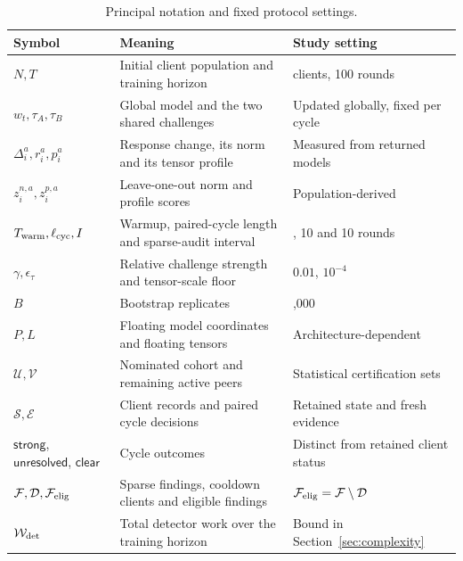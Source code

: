\begin{table}[t]\centering\footnotesize
\renewcommand{\arraystretch}{1.05}
\caption{Principal notation and fixed protocol settings.}\label{tab:notation-settings}
\begin{tabular}{>{\raggedright\arraybackslash}p{3.1cm}>{\raggedright\arraybackslash}p{8.0cm}>{\raggedright\arraybackslash}p{4.8cm}}\toprule
Symbol & Meaning & Study setting \\ \midrule
$N,T$ & Initial client population and training horizon & 100 clients, 100 rounds \\
$w_t,\tau_A,\tau_B$ & Global model and the two shared challenges & Updated globally, fixed per cycle \\
$\Delta_i^a,r_i^a,p_i^a$ & Response change, its norm and its tensor profile & Measured from returned models \\
$z_i^{n,a},z_i^{p,a}$ & Leave-one-out norm and profile scores & Population-derived \\
$T_{\rm warm},\ell_{\rm cyc},I$ & Warmup, paired-cycle length and sparse-audit interval & 10, 10 and 10 rounds \\
$\gamma,\epsilon_\tau$ & Relative challenge strength and tensor-scale floor & $0.01$, $10^{-4}$ \\
$B$ & Bootstrap replicates & 1,000 \\
$P,L$ & Floating model coordinates and floating tensors & Architecture-dependent \\
$\mathcal U,\mathcal V$ & Nominated cohort and remaining active peers & Statistical certification sets \\
$\mathcal S,\mathcal E$ & Client records and paired cycle decisions & Retained state and fresh evidence \\
$\mathsf{strong}$, $\mathsf{unresolved}$, $\mathsf{clear}$ & Cycle outcomes & Distinct from retained client status \\
$\mathcal F,\mathcal D,\mathcal F_{\rm elig}$ & Sparse findings, cooldown clients and eligible findings & $\mathcal F_{\rm elig}=\mathcal F\setminus\mathcal D$ \\
$\mathcal W_{\rm det}$ & Total detector work over the training horizon & Bound in Section~\ref{sec:complexity} \\
\bottomrule\end{tabular}
\end{table}
